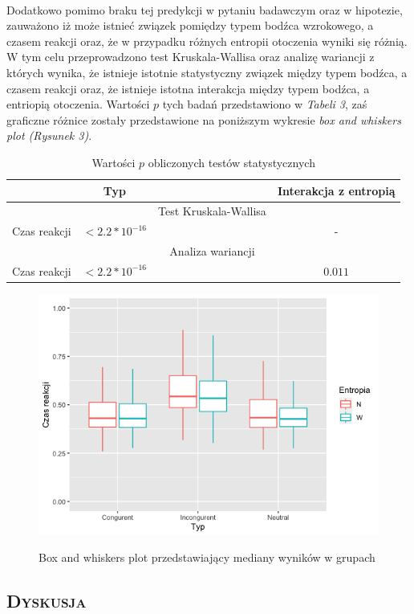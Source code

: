\documentclass[12pt,a4paper,final,oneside,onecolumn,titlepage]{article}
\begin{document}
\paragraph{}
Dodatkowo pomimo braku tej predykcji w pytaniu badawczym oraz w hipotezie, zauważono iż może istnieć związek pomiędzy typem bodźca wzrokowego, a czasem reakcji oraz, że w przypadku różnych entropii otoczenia wyniki się różnią. W tym celu przeprowadzono test Kruskala-Wallisa oraz analizę wariancji z których wynika, że istnieje istotnie statystyczny związek między typem bodźca, a czasem reakcji oraz, że istnieje istotna interakcja między typem bodźca, a entriopią otoczenia. Wartości $p$ tych badań przedstawiono w \textit{Tabeli 3}, zaś graficzne różnice zostały przedstawione na poniższym wykresie \textit{box and whiskers plot (Rysunek 3)}.
\begin{table}[h]
\caption{Wartości $p$ obliczonych testów statystycznych}
\centering
\begin{tabular}{l c c c}
\hline\hline
 & Typ & & Interakcja z entropią \\ [0.5ex]
\hline
 & &Test Kruskala-Wallisa & \\ [2ex]
Czas reakcji&$<2.2*10^{-16}$& &- \\
\hline
 & &Analiza wariancji& \\ [2ex]
Czas reakcji&$<2.2*10^{-16}$& &$0.011$ \\
\hline
\end{tabular}
\label{Tabela}
\end{table}
\begin{figure}[h]
\centering
\caption{Box and whiskers plot przedstawiający mediany wyników w grupach}
\includegraphics[scale=0.5]{box2}
\label{Rysunek}
\end{figure}
\begin{center}
\section*{\large{\textbf{\textsc{Dyskusja}}}}
\end{center}
\newpage

\end{document}
